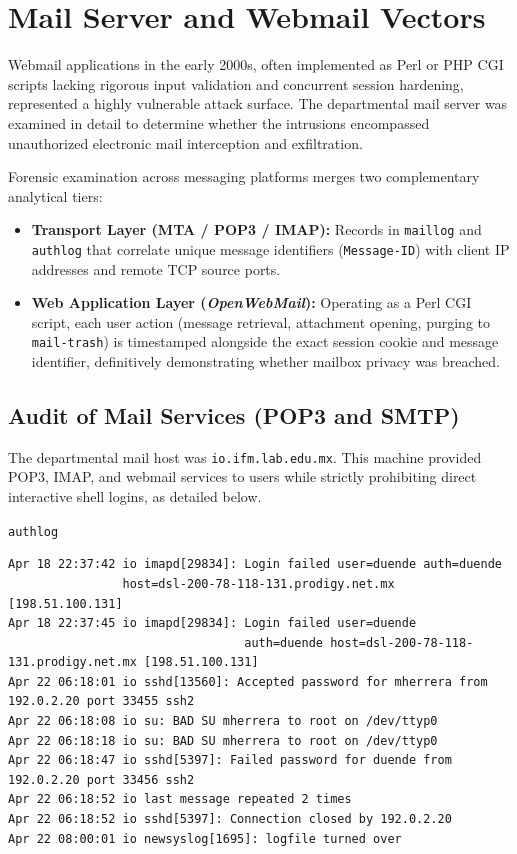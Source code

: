 \chapter{Mail Server and Webmail Vectors}
\label{cap:servidor_correo_webmail}

Webmail applications in the early 2000s, often implemented as Perl or PHP CGI scripts lacking rigorous input validation and concurrent session hardening, represented a highly vulnerable attack surface. The departmental mail server was examined in detail to determine whether the intrusions encompassed unauthorized electronic mail interception and exfiltration.

\begin{notaforense}
Forensic examination across messaging platforms merges two complementary analytical tiers:
\begin{itemize}
    \item \textbf{Transport Layer (MTA / POP3 / IMAP):} Records in \texttt{maillog} and \texttt{authlog} that correlate unique message identifiers (\texttt{Message-ID}) with client IP addresses and remote TCP source ports.
    \item \textbf{Web Application Layer (\textit{OpenWebMail}):} Operating as a Perl CGI script, each user action (message retrieval, attachment opening, purging to \texttt{mail-trash}) is timestamped alongside the exact session cookie and message identifier, definitively demonstrating whether mailbox privacy was breached.
\end{itemize}
\end{notaforense}

\section{Audit of Mail Services (POP3 and SMTP)}

The departmental mail host was \nolinkurl{io.ifm.lab.edu.mx}. This machine provided POP3, IMAP, and webmail services to users while strictly prohibiting direct interactive shell logins, as detailed below.

\texttt{authlog}
 
\vspace{1em}

\begin{lstlisting}[style=terminal] 
Apr 18 22:37:42 io imapd[29834]: Login failed user=duende auth=duende 
                host=dsl-200-78-118-131.prodigy.net.mx [198.51.100.131]
Apr 18 22:37:45 io imapd[29834]: Login failed user=duende 
                                 auth=duende host=dsl-200-78-118-131.prodigy.net.mx [198.51.100.131]
Apr 22 06:18:01 io sshd[13560]: Accepted password for mherrera from 192.0.2.20 port 33455 ssh2
Apr 22 06:18:08 io su: BAD SU mherrera to root on /dev/ttyp0
Apr 22 06:18:18 io su: BAD SU mherrera to root on /dev/ttyp0
Apr 22 06:18:47 io sshd[5397]: Failed password for duende from 192.0.2.20 port 33456 ssh2
Apr 22 06:18:52 io last message repeated 2 times
Apr 22 06:18:52 io sshd[5397]: Connection closed by 192.0.2.20
Apr 22 08:00:01 io newsyslog[1695]: logfile turned over
\end{lstlisting}

